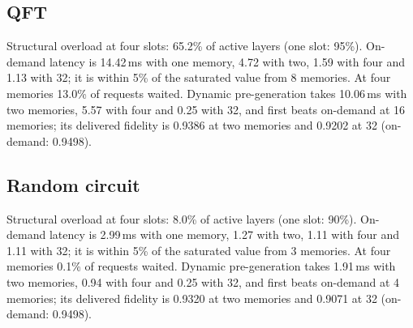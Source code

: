 \subsection*{QFT}
Structural overload at four slots: 65.2\% of active layers (one slot: 95\%). On-demand latency is 14.42\,ms with one memory, 4.72 with two, 1.59 with four and 1.13 with 32; it is within 5\% of the saturated value from 8 memories. At four memories 13.0\% of requests waited. Dynamic pre-generation takes 10.06\,ms with two memories, 5.57 with four and 0.25 with 32, and first beats on-demand at 16 memories; its delivered fidelity is 0.9386 at two memories and 0.9202 at 32 (on-demand: 0.9498).

\subsection*{Random circuit}
Structural overload at four slots: 8.0\% of active layers (one slot: 90\%). On-demand latency is 2.99\,ms with one memory, 1.27 with two, 1.11 with four and 1.11 with 32; it is within 5\% of the saturated value from 3 memories. At four memories 0.1\% of requests waited. Dynamic pre-generation takes 1.91\,ms with two memories, 0.94 with four and 0.25 with 32, and first beats on-demand at 4 memories; its delivered fidelity is 0.9320 at two memories and 0.9071 at 32 (on-demand: 0.9498).
